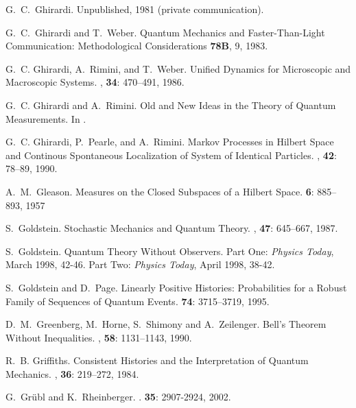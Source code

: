 \documentclass[12pt]{article}
\begin{document}
\begin{thebibliography}{10}
 G.~C.~Ghirardi. Unpublished, 1981 (private
   communication).

 G.~C.~Ghirardi and T.~Weber. \newblock Quantum Mechanics and Faster-Than-Light
Communication: Methodological Considerations  {\bf 78B}, 9, 1983.

 G.~C. Ghirardi, A.~Rimini, and T.~Weber.  \newblock
   Unified {D}ynamics for {M}icroscopic and {M}acroscopic {S}ystems.
   , {\bf 34}: 470--491, 1986.

 G.~C. Ghirardi and A.~Rimini.  \newblock Old and {N}ew
   {I}deas in the {T}heory of {Q}uantum {M}easurements.  \newblock In
   \cite{Mil90}.

 G.~C. Ghirardi, P.~Pearle, and A.~Rimini.  \newblock
   Markov {P}rocesses in {H}ilbert {S}pace and {C}ontinous
   {S}pontaneous {L}ocalization of {S}ystem of {I}dentical {P}articles.
   , {\bf 42}: 78--89, 1990.

 A.~M.~Gleason.  \newblock Measures on the Closed
   Subspaces of a Hilbert Space.  
   {\bf 6}: 885--893, 1957

 S.~Goldstein. \newblock Stochastic Mechanics and
   Quantum Theory.  ,
   {\bf 47}: 645--667, 1987.

 S.~Goldstein.  \newblock Quantum Theory Without
   Observers.  \newblock Part One: {\em Physics Today}, March 1998,
   42-46.  Part Two: {\em Physics Today}, April 1998, 38-42.

 S.~Goldstein and D.~Page.  \newblock Linearly
   Positive Histories: Probabilities for a Robust Family of Sequences
   of Quantum Events.   {\bf 74}:
   3715--3719, 1995.


 D.~M.~Greenberg, M.~Horne, S.~Shimony and
   A.~Zeilenger.  \newblock Bell's {T}heorem {W}ithout {I}nequalities.
   , {\bf 58}: 1131--1143,
   1990.

 R.~B. Griffiths.  \newblock Consistent {H}istories and
   the {I}nterpretation of {Q}uantum {M}echanics.  , {\bf 36}: 219--272, 1984.

 G.~Gr\"ubl and K.~Rheinberger. . 
   {\bf 35}: 2907-2924, 2002.


\end{thebibliography}
\end{document}
